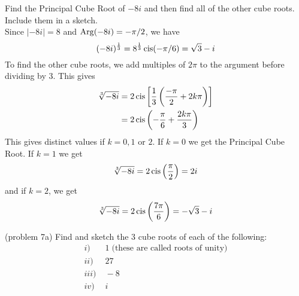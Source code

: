 \documentclass[handout]{ximera}
\begin{document}
\begin{example}[Example 7]
Find the Principal Cube Root of $-8i$ and then find all of the other cube roots. Include them in a sketch.\\
Since $|-8i| = 8$ and $\operatorname{Arg}(-8i) = -\pi/2$, we have
\[
(-8i)^{\frac13} = 8^{\frac13} \operatorname{cis}(-\pi/6) = \sqrt 3 - i
\]
To find the other cube roots, we add multiples of $2\pi$ to the argument before dividing by $3$.
This gives
\begin{align*}
\sqrt[3]{-8i} &= 2 \operatorname{cis}\left[\frac13\left(\frac{-\pi}{2} + 2k\pi\right)\right] \\
              &= 2 \operatorname{cis}\left(-\frac{\pi}{6} + \frac{2k\pi}{3}\right)
\end{align*}
     This gives distinct values if $k = 0, 1$ or $2$. If $k=0$ we get the Principal Cube Root.
     If $k = 1$ we get
\[
\sqrt[3]{-8i}= 2 \operatorname{cis}\left(\frac{\pi}{2}\right)  = 2i 
\]
and if $k = 2$, we get
\[
\sqrt[3]{-8i}= 2 \operatorname{cis}\left(\frac{7\pi}{6}\right) = -\sqrt 3 - i 
 \]    
\begin{image}
\end{image}

\end{example}


\begin{problem}(problem 7a)
Find and sketch the 3 cube roots of each of the following:\\
\begin{align*}
i) & \;1 \; \mbox{(these are called roots of unity)} \\
ii)& \;27 \\
iii) & \;-8 \\
iv) & \;i
\end{align*}
\end{problem}
\end{document}
